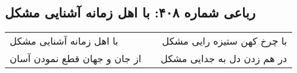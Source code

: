 \begin{center}
\section*{رباعی شماره ۴۰۸: با اهل زمانه آشنایی مشکل}
\label{sec:sh408}
\begin{longtable}{l p{0.5cm} r}
با اهل زمانه آشنایی مشکل
&&
با چرخ کهن ستیزه رایی مشکل
\\
از جان و جهان قطع نمودن آسان
&&
در هم زدن دل به جدایی مشکل
\\
\end{longtable}
\end{center}
